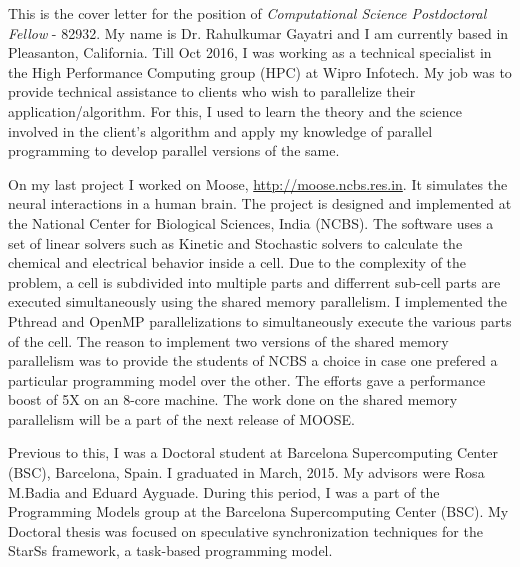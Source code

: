 \documentclass[10pt,stdletter,dateno]{newlfm}
\begin{document}
\begin{newlfm}
	   This is the cover letter for the position of {\it Computational Science Postdoctoral Fellow} - 82932. 
	   My name is Dr. Rahulkumar Gayatri and I am currently based in Pleasanton, California. 
	   Till Oct 2016, I was working as a technical specialist in the High Performance Computing group (HPC) at Wipro Infotech. 
	   My job was to provide technical assistance to clients who wish to parallelize their application/algorithm.
	   For this, I used to learn the theory and the science involved in the client's algorithm and apply my knowledge of parallel programming to develop parallel versions of the same.
%	   
	   \par
       On my last project I worked on Moose, \href{url}{http://moose.ncbs.res.in}.
	   It simulates the neural interactions in a human brain. 
	   The project is designed and implemented at the National Center for Biological Sciences, India (NCBS). 
	   The software uses a set of linear solvers such as Kinetic and Stochastic solvers to calculate the chemical and electrical behavior inside a cell. 
	   Due to the complexity of the problem, a cell is subdivided into multiple parts and differrent sub-cell parts are executed simultaneously using the shared memory parallelism. 
	   I implemented the Pthread and OpenMP parallelizations to simultaneously execute the various parts of the cell. 
	   The reason to implement two versions of the shared memory parallelism was to provide the students of NCBS a choice in case one prefered a particular programming model over the other.
	   The efforts gave a performance boost of 5X on an 8-core machine.
	   The work done on the shared memory parallelism will be a part of the next release of MOOSE.
%	   
	   \par
	   Previous to this, I was a Doctoral student at Barcelona Supercomputing Center (BSC), Barcelona, Spain. I graduated in March, 2015. 
	   My advisors were Rosa M.Badia and Eduard Ayguade.  
	   During this period, I was a part of the Programming Models group at the Barcelona Supercomputing Center (BSC). 
	   My Doctoral thesis was focused on speculative synchronization techniques for the StarSs framework, a task-based programming model.


\end{newlfm}
\end{document}

